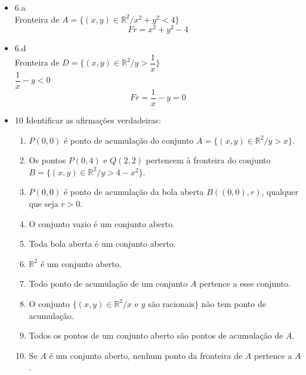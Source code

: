 \documentclass{article}
\begin{document}
\begin{itemize}
		\item 6.a
		\\Fronteira de $A =\{(x,y)\in \mathbb{R}^2/x^2+y^2<4\}$
		$$Fr = x^2+y^2 - 4$$
		\item 6.d
		\\Fronteira de $D=\{(x,y)\in \mathbb{R}^2/y>\dfrac{1}{x}\}$
		\\$\dfrac{1}{x}-y<0$
		$$Fr = \dfrac{1}{x}-y = 0$$
		\item 10 Identificar as afirmações verdadeiras:
			\begin{enumerate}
				\item $P(0,0)$ é ponto de acumulação do conjunto $A =\{(x,y) \in \mathbb{R}^2 / y>x\}$.
				\item Os pontos $P(0,4)$ e $Q(2,2)$ pertencem à fronteira do conjunto $B = \{(x,y) \in \mathbb{R}^2 / y>4-x^2\}$.
				\item $P(0,0)$ é ponto de acumulação da bola aberta $B((0,0),r)$, qualquer que seja $r>0$.
				\item O conjunto vazio é um conjunto aberto.
				\item Toda bola aberta é um conjunto aberto.
				\item $\mathbb{R}^2$ é um conjunto aberto.
				\item Todo ponto de acumulação de um conjunto $A$ pertence a esse conjunto.
				\item O conjunto $\{(x,y) \in \mathbb{R}^2 / x$ e $y$ são racionais$\}$ não tem ponto de acumulação.
				\item Todos os pontos de um conjunto aberto são pontos de acumulação de $A$.
				\item Se $A$ é um conjunto aberto, nenhum ponto da fronteira de $A$ pertence a $A$.
			\end{enumerate}
	\end{itemize}
\end{document}
